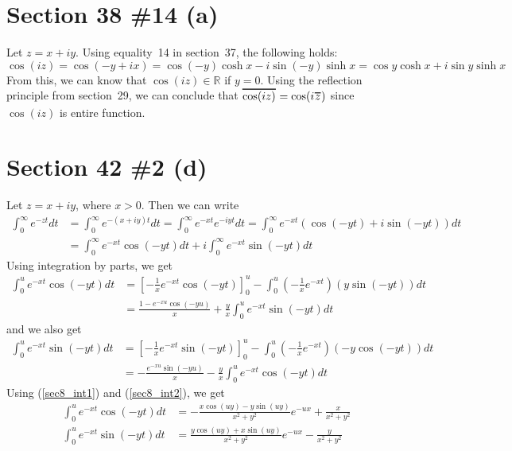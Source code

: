 \documentclass{scrartcl}
\newcommand\Overline[2][0.8pt]{%
  \begin{tikzpicture}[baseline=(a.base)]
    \node[inner xsep=0pt,inner ysep=1.5pt] (a) {$#2$};
    \draw[line width= #1] (a.north west) -- (a.north east);
  \end{tikzpicture}
}
\begin{document}
\section{Section 38 \#14 (a)}
Let \(z = x + iy\).
Using equality~14 in section~37, the following holds:
\[
  \cos (iz) = \cos (-y + ix) = \cos (-y) \cosh x - i \sin (-y) \sinh x = \cos y \cosh x + i \sin y \sinh x
\]
From this, we can know that \(\cos (iz) \in \mathbb{R}\) if \(y = 0\).
Using the reflection principle from section~29, we can conclude that \(\Overline{\cos (iz)} = \cos (i\Overline{z})\) since \(\cos (iz)\) is entire function.

\section{Section 42 \#2 (d)}
Let \(z = x + iy\), where \(x > 0\).
Then we can write
\begin{align*}
  \int^\infty_0 e^{-zt} dt &= \int^\infty_0 e^{-(x + iy)t} dt = \int^\infty_0 e^{-xt} e^{-iyt} dt = \int^\infty_0 e^{-xt} (\cos(-yt) + i \sin(-yt)) dt \\
                           &= \int^\infty_0 e^{-xt} \cos(-yt) dt + i \int^\infty_0 e^{-xt} \sin(-yt) dt
\end{align*}
Using integration by parts, we get
\begin{align}
  \nonumber \int^u_0 e^{-xt} \cos(-yt) dt &= \left[ -\frac{1}{x} e^{-xt} \cos(-yt) \right]^u_0 - \int^u_0 \left( -\frac{1}{x} e^{-xt} \right) (y \sin (-yt)) dt \\
  \label{sec8_int1}                       &= \frac{1 - e^{-xu}\cos(-yu)}{x} + \frac{y}{x} \int^u_0 e^{-xt} \sin(-yt) dt
\end{align}
and we also get
\begin{align}
  \nonumber \int^u_0 e^{-xt} \sin(-yt) dt &= \left[ -\frac{1}{x} e^{-xt} \sin(-yt) \right]^u_0 - \int^u_0 \left( -\frac{1}{x} e^{-xt} \right) (-y \cos (-yt)) dt \\
  \label{sec8_int2}                       &= -\frac{e^{-xu} \sin(-yu)}{x} - \frac{y}{x} \int^u_0 e^{-xt} \cos(-yt) dt
\end{align}
Using (\ref{sec8_int1}) and (\ref{sec8_int2}), we get
\begin{align*}
  \int^u_0 e^{-xt} \cos(-yt) dt &= -\frac{x \cos\left(u y\right) - y \sin\left(u y\right)}{x^{2} + y^{2}}e^{-ux} + \frac{x}{x^2 + y^2} \\
  \int^u_0 e^{-xt} \sin(-yt) dt &= \frac{y \cos\left(u y\right) + x \sin\left(u y\right)}{x^{2} + y^{2}}e^{-ux} - \frac{y}{x^2 + y^2}
\end{align*}
\end{document}
